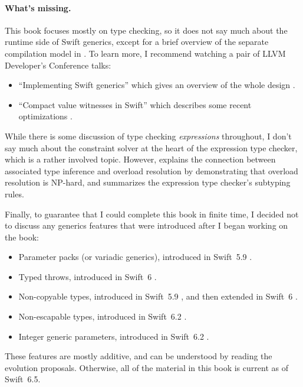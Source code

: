 \documentclass[../generics]{subfiles}
\begin{document}
\paragraph{What's missing.}
This book focuses mostly on type checking, so it does not say much about the runtime side of Swift generics, except for a brief overview of the separate compilation model in . To learn more, I recommend watching a pair of LLVM Developer's Conference talks:
\begin{itemize}
\item ``Implementing Swift generics'' which gives an overview of the whole design \cite{llvmtalk}.
\item ``Compact value witnesses in Swift'' which describes some recent optimizations \cite{cvwtalk}.
\end{itemize}

While there is some discussion of type checking \emph{expressions} throughout, I don't say much about the constraint solver at the heart of the expression type checker, which is a rather involved topic. However,  explains the connection between associated type inference and overload resolution by demonstrating that overload resolution is NP-hard, and  summarizes the expression type checker's subtyping rules.

\pagebreak

Finally, to guarantee that I could complete this book in finite time, I decided not to discuss any generics features that were introduced after I began working on the book:
\begin{itemize}
\item {}Parameter packs (or variadic generics), introduced in Swift~5.9 \cite{se0393,se0398,se0399}.
\item {}Typed throws, introduced in Swift~6 \cite{se0413}.
\item {}Non-copyable types, introduced in Swift~5.9 \cite{se0390}, and then extended in Swift~6 \cite{se0427}.
\item {}Non-escapable types, introduced in Swift~6.2 \cite{se0446}.
\item Integer generic parameters, introduced in Swift~6.2 \cite{se0452}.
\end{itemize}
These features are mostly additive, and can be understood by reading the evolution proposals. Otherwise, all of the material in this book is current as of Swift~6.5.
\end{document}
